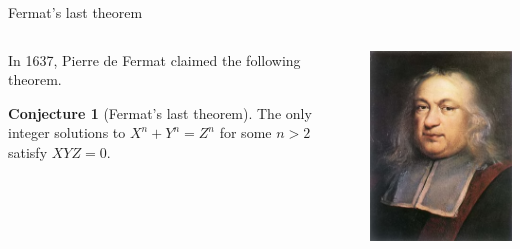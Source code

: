 \documentclass[10pt]{beamer}
\theoremstyle{definition}
\newtheorem{conjecture}{Conjecture}
\begin{document}
\begin{frame}[t]{Fermat's last theorem}

\begin{columns}[T]

\begin{column}{0.8\textwidth}
In 1637, Pierre de Fermat claimed the following theorem.

\vspace{0.5cm}

\begin{conjecture}[Fermat's last theorem]
The only integer solutions to $ X^n + Y^n = Z^n $ for some $ n > 2 $ satisfy $ XYZ = 0 $.
\end{conjecture}
\end{column}

\begin{column}{0.1\textwidth}
\hspace{-1cm}
\includegraphics[width=1.5\textwidth]{fermat.jpg}
\end{column}


\end{columns}
\end{frame}
\end{document}
